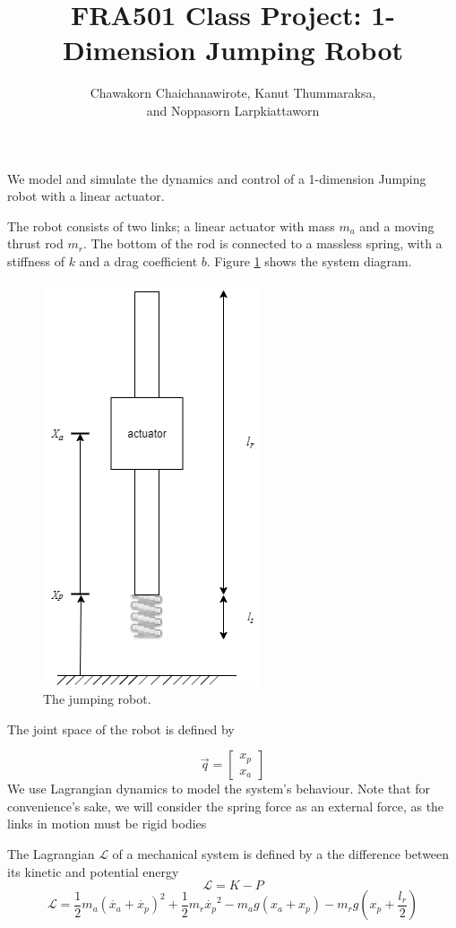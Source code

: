 \documentclass[12pt, a4paper]{report}
\title{FRA501 Class Project: 1-Dimension Jumping Robot}
\author{Chawakorn Chaichanawirote, Kanut Thummaraksa, 
	\\and Noppasorn Larpkiattaworn}
\begin{document}
\maketitle

We model and simulate the dynamics and control of a 1-dimension Jumping robot with a linear actuator.\par
The robot consists of two links; a linear actuator with mass $m_a$ and a moving thrust rod $m_r$. The bottom of the rod is connected to a massless spring, with a stiffness of $k$ and a drag coefficient $b$. Figure \ref{fig:system} shows the system diagram.

\begin{figure}[h]
	\vspace{1pt}
	\centering
	\includegraphics[scale=0.6]{images/JumpingRobot.png} 
	\caption{The jumping robot.}
	\label{fig:system}
\end{figure}\par

The joint space of the robot is defined by

\begin{equation}
	\vec{q} = \begin{bmatrix}
	x_{p}\\
	x_{a}
	\end{bmatrix}
\end{equation}
We use Lagrangian dynamics to model the system's behaviour. Note that for convenience's sake, we will consider the spring force as an external force, as the links in motion must be rigid bodies\par
The Lagrangian $\mathcal{L}$ of a mechanical system is defined by a the difference between its kinetic and potential energy
\begin{equation}
\mathcal{L} = K - P
\end{equation}
\begin{equation}
	\mathcal{L} = \frac{1}{2}m_{a}(\dot{x_{a}} + \dot{x_{p}})^{2}+\frac{1}{2}m_{r}\dot{x_{p}}^{2}-m_{a}g(x_{a}+x_{p})-m_{r}g(x_{p}+\frac{l_{r}}{2})
\end{equation}
\end{document}
